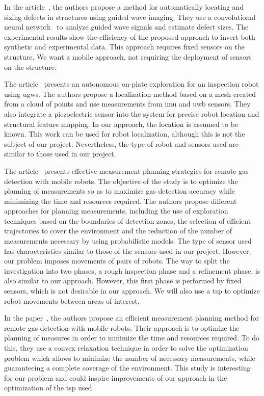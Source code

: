 In the article~\cite{articlesvsdf}, the authors propose a method for automatically locating and sizing defects in structures using guided wave imaging.
They use a convolutional neural network~\cite{enwiki:1159408824} to analyze guided wave signals and estimate defect sizes.
The experimental results show the efficiency of the proposed approach to invert both synthetic and experimental data.
This approach requires fixed sensors on the structure.
We want a mobile approach, not requiring the deployment of sensors on the structure.

The article~\cite{9568841} presents an autonomous on-plate exploration for an inspection robot using \gls{ugw}s.
The authors propose a localization method based on a mesh created from a cloud of points and use measurements from \gls{imu} and \gls{uwb} sensors.
They also integrate a piezoelectric sensor into the system for precise robot location and structural feature mapping.
In our approach, the location is assumed to be known.
This work can be used for robot localization, although this is not the subject of our project.
Nevertheless, the type of robot and sensors used are similar to those used in our project.

The article~\cite{7487624} presents effective measurement planning strategies for remote gas detection with mobile robots.
The objective of the study is to optimize the planning of measurements so as to maximize gas detection accuracy while minimizing the time and resources required.
The authors propose different approaches for planning measurements, including the use of exploration techniques based on the boundaries of detection zones, the selection of efficient trajectories to cover the environment and the reduction of the number of measurements necessary by using probabilistic models.
The type of sensor used has characteristics similar to those of the sensors used in our project.
However, our problem imposes movements of pairs of robots.
The way to split the investigation into two phases, a rough inspection phase and a refinement phase, is also similar to our approach.
However, this first phase is performed by fixed sensors, which is not desirable in our approach.
We will also use a \gls{tsp} to optimize robot movements between areas of interest.

In the paper~\cite{7139673}, the authors propose an efficient measurement planning method for remote gas detection with mobile robots.
Their approach is to optimize the planning of measures in order to minimize the time and resources required.
To do this, they use a convex relaxation technique in order to solve the optimization problem which allows to minimize the number of necessary measurements, while guaranteeing a complete coverage of the environment.
This study is interesting for our problem and could inspire improvements of our approach in the optimization of the \gls{tsp} used.

